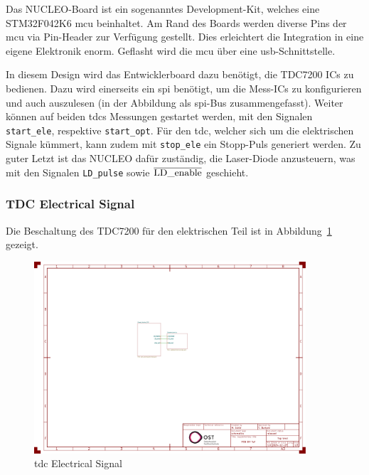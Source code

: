 Das NUCLEO-Board ist ein sogenanntes \dq Development-Kit\dq, welches eine STM32F042K6 \acrshort{mcu}
beinhaltet. Am Rand des Boards werden diverse Pins der \acrfull{mcu} via Pin-Header zur Verfügung gestellt. Dies erleichtert
die Integration in eine eigene Elektronik enorm. Geflasht wird die \acrshort{mcu} über eine \acrshort{usb}-Schnittstelle.

In diesem Design wird das Entwicklerboard dazu benötigt, die TDC7200 ICs zu
bedienen. Dazu wird einerseits ein \acrfull{spi} benötigt, um die Mess-ICs zu konfigurieren
und auch auszulesen (in der Abbildung als \acrshort{spi}-Bus zusammengefasst). Weiter können auf beiden \acrshort{tdc}s
Messungen gestartet werden, mit den Signalen \lstinline|start_ele|, respektive \lstinline|start_opt|. Für den
\acrshort{tdc}, welcher sich um die elektrischen Signale kümmert, kann zudem mit \lstinline|stop_ele| ein
Stopp-Puls generiert werden.
Zu guter Letzt ist das NUCLEO dafür zuständig, die Laser-Diode anzusteuern, was mit den Signalen
\lstinline|LD_pulse| sowie $\overline{\mbox{\lstinline|LD_enable|}}$ geschieht.

\subsubsection{TDC Electrical Signal}

Die Beschaltung des TDC7200 \cite{ti2016tdc7200_datasheet} für den elektrischen Teil ist in
Abbildung~\ref{fig:tdc_ele_signal} gezeigt.

\begin{figure}[H]
    \centering
    \includegraphics[page=2, trim=80 330 750 310, clip, width=0.9\textwidth]{attachments/schematic.pdf}
    \caption{\acrshort{tdc} Electrical Signal}\label{fig:tdc_ele_signal}
\end{figure}

